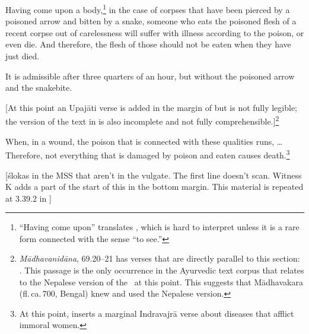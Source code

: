 \begin{translation}[resume]
\dag Having come upon a body,\footnote{“Having come upon” translates
    , which is hard to interpret unless it is a rare form
    connected with the sense “to see.”} in the case of corpses that have
    been pierced by a poisoned arrow and bitten by a snake, someone who
    eats the poisoned flesh of a recent corpse out of carelessness will
    suffer with illness according to the poison, or even die. And
    therefore, the flesh of those should not be eaten when they have just
    died.
  
It is admissible after three quarters of an hour, but without the
poisoned arrow and the snakebite.
  
\item[35.1]

[At this point an Upajāti verse is added in the margin of
 but is not fully legible; the version of the
text in  is also incomplete and not fully
comprehensible.]\footnote{\emph{Mādhavanidāna}, 69.20--21
    \citep[480]{madhava1} has verses that are directly parallel to this
    section: . This passage is the only occurrence in the Ayurvedic text
    corpus that relates to the Nepalese version of the \SS\ at this point.
    This suggests that Mādhavakara (fl.\,ca.\,700, Bengal) knew and used
    the Nepalese version.}
  

  \item[35.3]

\dag When, in a wound, the poison that is connected with these
qualities runs, \ldots Therefore, not everything that is damaged by
poison and eaten causes death.\footnote{At this point,  inserts a marginal Indravajrā verse about diseases that
    afflict immoral women.}
  
\item[35.1] 

  [ślokas in the MSS that aren't in the vulgate. The first line
doesn't scan. Witness K adds a part of the start of this in the
bottom margin. This material is repeated at 3.39.2 in ]
  

  \item
  [35cd \& 36cd] 
  

\end{translation}
